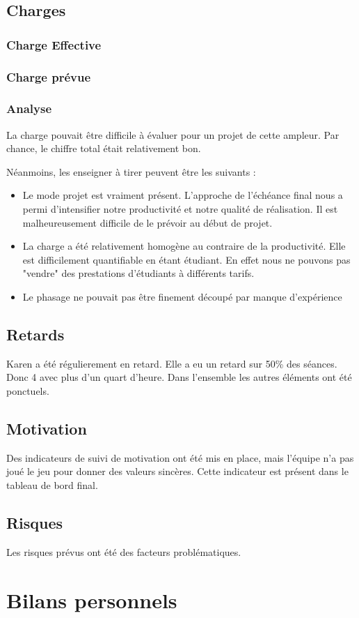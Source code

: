 \subsection{Charges}
\subsubsection{Charge Effective}


\subsubsection{Charge prévue}


\subsubsection{Analyse}
La charge pouvait être difficile à évaluer pour un projet de cette ampleur.
Par chance, le chiffre total était relativement bon. 

Néanmoins, les enseigner à tirer peuvent être les suivants : 
\begin{itemize}
\item Le mode projet est vraiment présent. L'approche de l'échéance final nous
a permi d'intensifier notre productivité et notre qualité de réalisation. Il est
malheureusement difficile de le prévoir au début de projet.
\item La charge a été relativement homogène au contraire de la productivité. Elle
est difficilement quantifiable en étant étudiant. En effet nous ne pouvons pas
"vendre" des prestations d'étudiants à différents tarifs.
\item Le phasage ne pouvait pas être finement découpé par manque d'expérience
\end{itemize}

\subsection{Retards}
Karen a été régulierement en retard. Elle a eu un retard sur 50\% des séances. 
Donc 4 avec plus d'un quart d'heure. Dans l'ensemble les autres éléments ont été
 ponctuels.

\subsection{Motivation}
Des indicateurs de suivi de motivation ont été mis en place, mais l'équipe n'a 
pas joué le jeu pour donner des valeurs sincères. 
Cette indicateur est présent dans le tableau de bord final.

\subsection{Risques}
Les risques prévus ont été des facteurs problématiques. 

\section{Bilans personnels}
